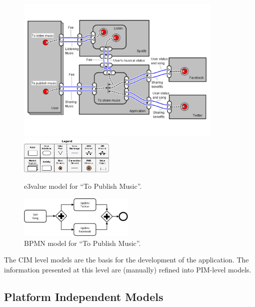 \begin{figure}\center
\includegraphics[width=0.88\textwidth]{figs/e3value.pdf}
\hspace*{5cm}\includegraphics[width=0.4\textwidth]{figs/3ValueKey.pdf}
\caption{\label{fig:CIM:tpme3v} e3value model for ``To Publish Music''.}
\end{figure}

\begin{figure}\center
\includegraphics[width=0.49\textwidth]{figs/SC.pdf}
\caption{\label{fig:CIM:tpmbpmn} BPMN model for ``To Publish Music''.}
\end{figure}

The CIM level models are the basis for the development of the application. 
The information presented at this level are (manually) refined into PIM-level models.


\subsection{Platform Independent Models}

